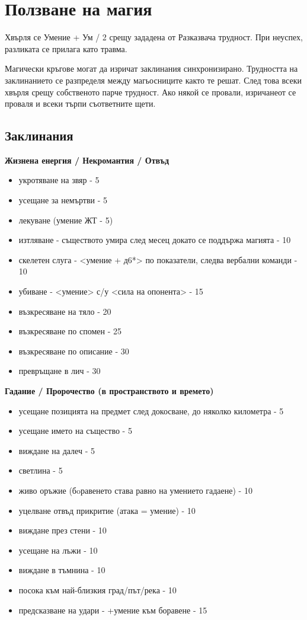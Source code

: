 \section{Ползване на магия}
Хвърля се Умение + Ум / 2 срещу зададена от Разказвача трудност. При
неуспех, разликата се прилага като травма.

Магически кръгове могат да изричат заклинания синхронизирано. Трудността
на заклинанието се разпределя между магьосниците както те решат. След това
всеки хвърля срещу собственото парче трудност. Ако някой се провали,
изричанеот се проваля и всеки търпи съответните щети.


\subsection{Заклинания} 

\textbf{Жизнена енергия / Некромантия / Отвъд}  \\ 
\begin{itemize}
  \item{укротяване на звяр - 5}
  \item{усещане за немъртви - 5}
  \item{лекуване (умение ЖТ - 5)}
  \item{изтляване - съществото умира след месец  докато се поддържа магията - 10}
  \item{скелетен слуга - <умение + д6*> по показатели, следва вербални команди - 10}
  \item{убиване - <умение> с/у <сила на опонента> - 15}
  \item{възкресяване на тяло - 20}
  \item{възкресяване по спомен - 25}
  \item{възкресяване по описание - 30}
  \item{превръщане в лич - 30}
\end{itemize}

\vspace{1cm}
\textbf{Гадание / Пророчество (в пространството и времето)}  \\
\begin{itemize}
  \item{усещане позицията на предмет след докосване, до няколко километра - 5}
  \item{усещане името на същество - 5}
  \item{виждане на далеч - 5}
  \item{светлина - 5}
  \item{живо оръжие (бoравенето става равно на умението гадаене) - 10}
  \item{уцелване отвъд прикритие (атака = умение) - 10}
  \item{виждане през стени - 10}
  \item{усещане на лъжи - 10}
  \item{виждане в тъмнина - 10}
  \item{посока към най-близкия град/път/река - 10}
  \item{предсказване на удари - +умение към боравене - 15}
\end{itemize}



